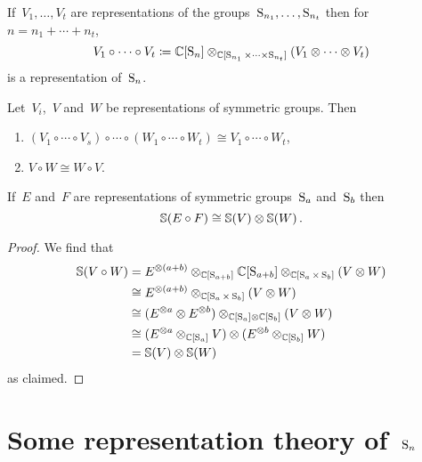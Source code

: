 \documentclass[a4paper,10pt]{scrartcl}
\begin{document}
If~$V_1, \dotsc, V_t$ are representations of the groups~$\operatorname{S}_{n_1}, \dotsc, \operatorname{S}_{n_t}$ then for~$n = n_1 + \dotsb + n_t$,
\[
  V_1 \circ \dotsb \circ V_t
  \coloneqq
  \mathbb{C}[\operatorname{S}_n]
  \otimes_{\mathbb{C}[\operatorname{S}_{n_1} \times \dotsb \times \operatorname{S}_{n_t}]}
  (V_1 \otimes \dotsb \otimes V_t)
\]
is a representation of~$\operatorname{S}_n$.

\begin{lemma}
  \label{properties of circle product}
  Let~$V_i$,~$V$ and~$W$ be representations of symmetric groups.
  Then
  \begin{enumerate}
    \item
      $(V_1 \circ \dotsb \circ V_s) \circ \dotsb \circ (W_1 \circ \dotsb \circ W_t) \cong V_1 \circ \dotsb \circ W_t$,
    \item
      $V \circ W \cong W \circ V$.
  \end{enumerate}
\end{lemma}

\begin{lemma}
  \label{multiplicativity of schur functor}
  If~$E$ and~$F$ are representations of symmetric groups~$\operatorname{S}_a$ and~$\operatorname{S}_b$ then
  \[
    \mathbb{S}(E \circ F) \cong \mathbb{S}(V) \otimes \mathbb{S}(W) \,.
  \]
\end{lemma}

\begin{proof}
  We find that
  \begin{align*}
    \mathbb{S}(V \circ W)
    &=
    E^{\otimes (a+b)}
    \otimes_{\mathbb{C}[\operatorname{S}_{a+b}]}
    \mathbb{C}[\operatorname{S}_{a+b}]
    \otimes_{\mathbb{C}[\operatorname{S}_a \times \operatorname{S}_b]}
    (V \otimes W)
    \\
    &\cong
    E^{\otimes (a+b)}
    \otimes_{\mathbb{C}[\operatorname{S}_a \times \operatorname{S}_b]}
    (V \otimes W)
    \\
    &\cong
    (E^{\otimes a} \otimes E^{\otimes b})
    \otimes_{\mathbb{C}[\operatorname{S}_a] \otimes \mathbb{C}[\operatorname{S}_b]}
    (V \otimes W)
    \\
    &\cong
    (E^{\otimes a} \otimes_{\mathbb{C}[\operatorname{S}_a]} V)
    \otimes
    (E^{\otimes b} \otimes_{\mathbb{C}[\operatorname{S}_b]} W)
    \\
    &=
    \mathbb{S}(V) \otimes \mathbb{S}(W)
  \end{align*}
  as claimed.
\end{proof}





\section{Some representation theory of~$\operatorname{S}_n$}
\end{document}
